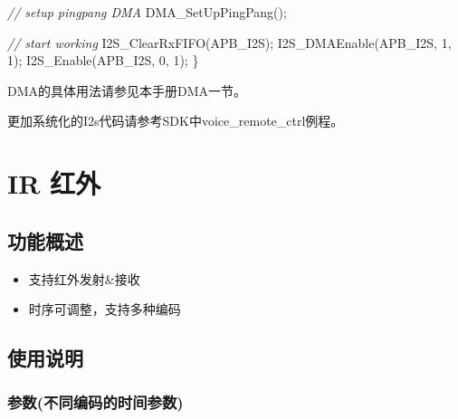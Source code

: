 \documentclass[
  12pt,
]{book}
\newenvironment{Shaded}{\begin{snugshade}}{\end{snugshade}}
\newcommand{\CommentTok}[1]{\textcolor[rgb]{0.56,0.35,0.01}{\textit{#1}}}
\newcommand{\DecValTok}[1]{\textcolor[rgb]{0.00,0.00,0.81}{#1}}
\newcommand{\NormalTok}[1]{#1}
\providecommand{\tightlist}{%
  \setlength{\itemsep}{0pt}\setlength{\parskip}{0pt}}
\begin{document}
\begin{Shaded}
\begin{Highlighting}[]
    \CommentTok{// setup pingpang DMA}
\NormalTok{    DMA_SetUpPingPang();}
    
    \CommentTok{// start working}
\NormalTok{    I2S_ClearRxFIFO(APB_I2S);}
\NormalTok{    I2S_DMAEnable(APB_I2S, }\DecValTok{1}\NormalTok{, }\DecValTok{1}\NormalTok{);    }
\NormalTok{    I2S_Enable(APB_I2S, }\DecValTok{0}\NormalTok{, }\DecValTok{1}\NormalTok{);}
\NormalTok{\}}
\end{Highlighting}
\end{Shaded}

DMA的具体用法请参见本手册DMA一节。

更加系统化的I2s代码请参考SDK中voice\_remote\_ctrl例程。

\hypertarget{ir-ux7ea2ux5916}{%
\chapter{IR 红外}\label{ir-ux7ea2ux5916}}

\hypertarget{ux529fux80fdux6982ux8ff0-2}{%
\section{功能概述}\label{ux529fux80fdux6982ux8ff0-2}}

\begin{itemize}
\tightlist
\item
  支持红外发射\&接收
\item
  时序可调整，支持多种编码
\end{itemize}

\hypertarget{ux4f7fux7528ux8bf4ux660e-2}{%
\section{使用说明}\label{ux4f7fux7528ux8bf4ux660e-2}}

\hypertarget{ux53c2ux6570ux4e0dux540cux7f16ux7801ux7684ux65f6ux95f4ux53c2ux6570}{%
\subsection{参数(不同编码的时间参数)}\label{ux53c2ux6570ux4e0dux540cux7f16ux7801ux7684ux65f6ux95f4ux53c2ux6570}}
\end{document}
